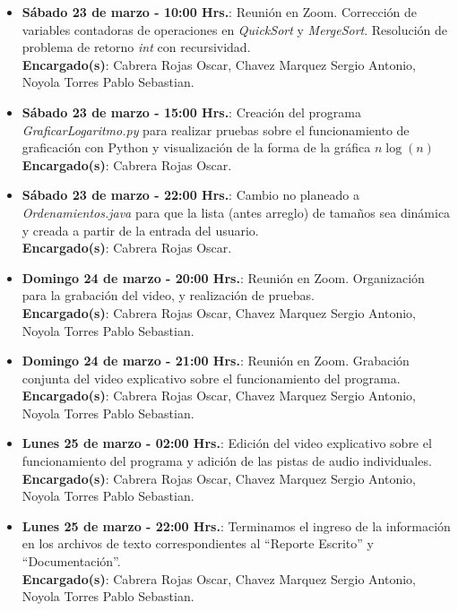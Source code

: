 \documentclass[a4paper,12pt]{article}
\begin{document}
\begin{itemize}
    \item \textbf{Sábado 23 de marzo - 10:00 Hrs.}: Reunión en Zoom. Corrección de variables contadoras de operaciones en \textit{QuickSort} y \textit{MergeSort}. Resolución de problema de retorno \textit{int} con recursividad.\\
    \textbf{Encargado(s)}: Cabrera Rojas Oscar, Chavez Marquez Sergio Antonio, Noyola Torres Pablo Sebastian.

    \item \textbf{Sábado 23 de marzo - 15:00 Hrs.}: Creación del programa \textit{GraficarLogaritmo.py} para realizar pruebas sobre el funcionamiento de graficación con Python y visualización de la forma de la gráfica $n\log(n)$\\
    \textbf{Encargado(s)}: Cabrera Rojas Oscar.

    \item \textbf{Sábado 23 de marzo - 22:00 Hrs.}: Cambio no planeado a \textit{Ordenamientos.java} para que la lista (antes arreglo) de tamaños sea dinámica y creada a partir de la entrada del usuario.\\
    \textbf{Encargado(s)}: Cabrera Rojas Oscar.

    \item \textbf{Domingo 24 de marzo - 20:00 Hrs.}: Reunión en Zoom. Organización para la grabación del video, y realización de pruebas.\\
    \textbf{Encargado(s)}: Cabrera Rojas Oscar, Chavez Marquez Sergio Antonio, Noyola Torres Pablo Sebastian.

    \item \textbf{Domingo 24 de marzo - 21:00 Hrs.}: Reunión en Zoom. Grabación conjunta del video explicativo sobre el funcionamiento del programa.\\
    \textbf{Encargado(s)}: Cabrera Rojas Oscar, Chavez Marquez Sergio Antonio, Noyola Torres Pablo Sebastian.

    \item \textbf{Lunes 25 de marzo - 02:00 Hrs.}: Edición del video explicativo sobre el funcionamiento del programa y adición de las pistas de audio individuales.\\
    \textbf{Encargado(s)}: Cabrera Rojas Oscar, Chavez Marquez Sergio Antonio, Noyola Torres Pablo Sebastian.

    \item \textbf{Lunes 25 de marzo - 22:00 Hrs.}: Terminamos el ingreso de la información en los archivos de texto correspondientes al ``Reporte Escrito'' y ``Documentación''.\\
    \textbf{Encargado(s)}: Cabrera Rojas Oscar, Chavez Marquez Sergio Antonio, Noyola Torres Pablo Sebastian.

\end{itemize}
\end{document}
